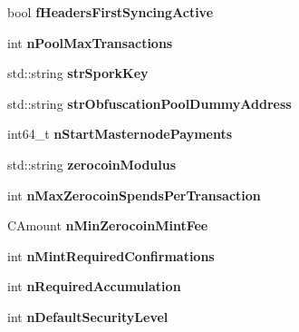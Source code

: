 \begin{DoxyCompactItemize}
\item 
\mbox{\label{class_c_chain_params_af9f11f9732810c7773747b2746be299c}} 
bool {\bfseries f\+Headers\+First\+Syncing\+Active}
\item 
\mbox{\label{class_c_chain_params_addb1962eb12784aaea932fd49b5fd40b}} 
int {\bfseries n\+Pool\+Max\+Transactions}
\item 
\mbox{\label{class_c_chain_params_a58ca704d8cc6f625f8757487cccb6250}} 
std\+::string {\bfseries str\+Spork\+Key}
\item 
\mbox{\label{class_c_chain_params_a652c1db947c78ef3c6a1e7f599d33525}} 
std\+::string {\bfseries str\+Obfuscation\+Pool\+Dummy\+Address}
\item 
\mbox{\label{class_c_chain_params_a80fe48978b6626fdbc50b314a030511b}} 
int64\+\_\+t {\bfseries n\+Start\+Masternode\+Payments}
\item 
\mbox{\label{class_c_chain_params_adf6118d28adb3e4284323ddaf8d88bdb}} 
std\+::string {\bfseries zerocoin\+Modulus}
\item 
\mbox{\label{class_c_chain_params_a4cde3d26a9cdd7bbf40c01322a65b19f}} 
int {\bfseries n\+Max\+Zerocoin\+Spends\+Per\+Transaction}
\item 
\mbox{\label{class_c_chain_params_ae272352816d1a4bcaca51d9ff38ee9c9}} 
C\+Amount {\bfseries n\+Min\+Zerocoin\+Mint\+Fee}
\item 
\mbox{\label{class_c_chain_params_a1d5815ad4550d75b90e7b1aed21ed324}} 
int {\bfseries n\+Mint\+Required\+Confirmations}
\item 
\mbox{\label{class_c_chain_params_ab2f6ee6ffdd7f14ef7e5a2fb40276f53}} 
int {\bfseries n\+Required\+Accumulation}
\item 
\mbox{\label{class_c_chain_params_a9d1590c701c4ba85601ced386103e2cc}} 
int {\bfseries n\+Default\+Security\+Level}
\item 

\end{DoxyCompactItemize}
